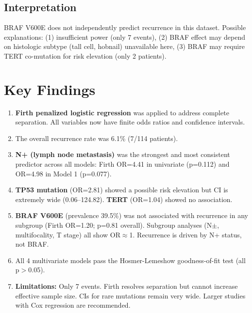 \documentclass[12pt,a4paper]{article}
\begin{document}
\subsection{Interpretation}
BRAF V600E does not independently predict recurrence in this dataset. Possible explanations: (1) insufficient power (only 7 events), (2) BRAF effect may depend on histologic subtype (tall cell, hobnail) unavailable here, (3) BRAF may require TERT co-mutation for risk elevation (only 2 patients).

\section{Key Findings}
\begin{enumerate}
  \item \textbf{Firth penalized logistic regression} was applied to address complete separation. All variables now have finite odds ratios and confidence intervals.
  \item The overall recurrence rate was 6.1\% (7/114 patients).
  \item \textbf{N+ (lymph node metastasis)} was the strongest and most consistent predictor across all models: Firth OR=4.41 in univariate (p=0.112) and OR=4.98 in Model 1 (p=0.077).
  \item \textbf{TP53 mutation} (OR=2.81) showed a possible risk elevation but CI is extremely wide (0.06--124.82). \textbf{TERT} (OR=1.04) showed no association.
  \item \textbf{BRAF V600E} (prevalence 39.5\%) was not associated with recurrence in any subgroup (Firth OR=1.20; p=0.81 overall). Subgroup analyses (N$\pm$, multifocality, T stage) all show OR$\approx$1. Recurrence is driven by N+ status, not BRAF.
  \item All 4 multivariate models pass the Hosmer-Lemeshow goodness-of-fit test (all p$>$0.05).
  \item \textbf{Limitations:} Only 7 events. Firth resolves separation but cannot increase effective sample size. CIs for rare mutations remain very wide. Larger studies with Cox regression are recommended.
\end{enumerate}
\end{document}
